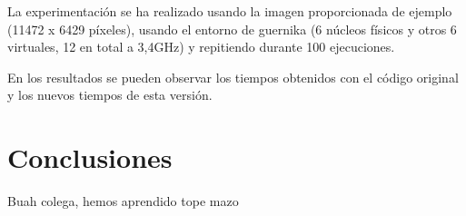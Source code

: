 \documentclass[12pt]{report} %
\begin{document}
La experimentación se ha realizado usando la imagen proporcionada de ejemplo (11472 x 6429 píxeles), usando el entorno de guernika (6 núcleos físicos y otros 6 virtuales, 12 en total a 3,4GHz) y repitiendo durante 100 ejecuciones.

En los resultados se pueden observar los tiempos obtenidos con el código original y los nuevos tiempos de esta versión.

\chapter{Conclusiones}

Buah colega, hemos aprendido tope mazo
\end{document}
